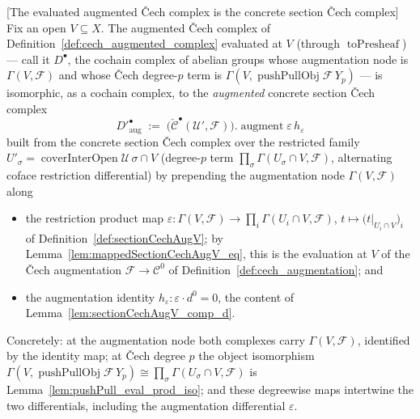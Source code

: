 \begin{lemma}

[The evaluated augmented {\v C}ech complex is the concrete section {\v C}ech complex]
  \label{lem:cechSection_complex_iso}
  Fix an open \(V \subseteq X\). The augmented {\v C}ech complex of
  Definition~\ref{def:cech_augmented_complex} evaluated at \(V\) (through
  \(\operatorname{toPresheaf}\)) --- call it \(D^\bullet\), the cochain complex of abelian
  groups whose augmentation node is \(\Gamma(V, \mathcal{F})\) and whose {\v C}ech degree-\(p\)
  term is \(\Gamma(V, \operatorname{pushPullObj}\mathcal{F}\,Y_p)\) --- is isomorphic, as a
  cochain complex, to the \emph{augmented} concrete section {\v C}ech complex
  \[
    D'^\bullet_{\mathrm{aug}} \;:=\;
    \bigl(\check{\mathcal{C}}^\bullet(\mathcal{U}', \mathcal{F})\bigr).\operatorname{augment}
      \varepsilon\, h_\varepsilon
  \]
  built from the concrete section {\v C}ech complex over the restricted family
  \(U'_\sigma = \operatorname{coverInterOpen}\mathcal{U}\,\sigma \cap V\) (degree-\(p\) term
  \(\prod_\sigma \Gamma(U_\sigma \cap V, \mathcal{F})\), alternating coface restriction
  differential) by prepending the augmentation node \(\Gamma(V, \mathcal{F})\) along
  \begin{itemize}
    \item the restriction product map \(\varepsilon : \Gamma(V, \mathcal{F}) \to
      \prod_i \Gamma(U_i \cap V, \mathcal{F})\), \(t \mapsto \bigl(t|_{U_i \cap V}\bigr)_i\)
      of Definition~\ref{def:sectionCechAugV}; by
      Lemma~\ref{lem:mappedSectionCechAugV_eq}, this is the evaluation at \(V\) of the {\v C}ech
      augmentation \(\mathcal{F} \to \mathcal{C}^0\) of Definition~\ref{def:cech_augmentation}; and
    \item the augmentation identity \(h_\varepsilon : \varepsilon \cdot d^0 = 0\), the
      content of Lemma~\ref{lem:sectionCechAugV_comp_d}.
  \end{itemize}
  Concretely: at the augmentation node both complexes carry \(\Gamma(V, \mathcal{F})\),
  identified by the identity map; at {\v C}ech degree \(p\) the object isomorphism
  \(\Gamma(V, \operatorname{pushPullObj}\mathcal{F}\,Y_p) \cong \prod_\sigma \Gamma(U_\sigma
  \cap V, \mathcal{F})\) is Lemma~\ref{lem:pushPull_eval_prod_iso}; and these degreewise maps
  intertwine the two differentials, including the augmentation differential \(\varepsilon\).
\end{lemma}
